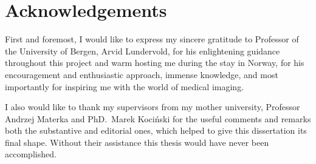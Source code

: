 \chapter*{Acknowledgements}

\thispagestyle{empty}

 \label{sec:acknowledgements}
	
First and foremost, I would like to express my sincere gratitude to Professor of the University of Bergen, Arvid Lundervold, for his enlightening guidance throughout this project and warm hosting me during the stay in Norway, for his encouragement and enthusiastic approach, immense knowledge, and most importantly for inspiring me with the world of medical imaging.

I also would like to thank my supervisors from my mother university, Professor Andrzej Materka and PhD.~Marek Kociński for the useful comments and remarks both the substantive and editorial ones, which helped to give this dissertation its final shape. Without their assistance this thesis would have never been accomplished.

\newpage
\thispagestyle{empty}
\mbox{}